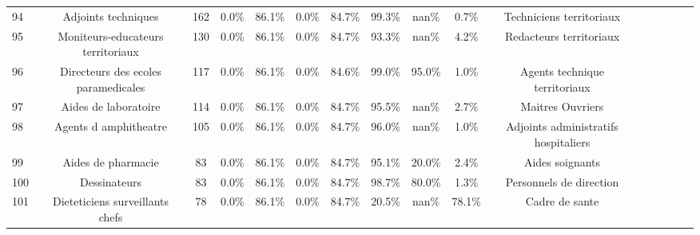\documentclass[10pt]{article}
\begin{document}
\begin{landscape}
\begin{longtable}{ | p{0.5cm} |*{15}{c|} }
94  &                                Adjoints techniques &            162 &           0.0\% &                  86.1\% &                 0.0\% &                    84.7\% &              99.3\% &                              nan\% &                                     0.7\% &                           Techniciens territoriaux \\
95  &                  Moniteurs-educateurs territoriaux &            130 &           0.0\% &                  86.1\% &                 0.0\% &                    84.7\% &              93.3\% &                              nan\% &                                     4.2\% &                            Redacteurs territoriaux \\
96  &                Directeurs des ecoles paramedicales &            117 &           0.0\% &                  86.1\% &                 0.0\% &                    84.6\% &              99.0\% &                             95.0\% &                                     1.0\% &                      Agents technique territoriaux \\
97  &                               Aides de laboratoire &            114 &           0.0\% &                  86.1\% &                 0.0\% &                    84.7\% &              95.5\% &                              nan\% &                                     2.7\% &                                   Maitres Ouvriers \\
98  &                              Agents d amphitheatre &            105 &           0.0\% &                  86.1\% &                 0.0\% &                    84.7\% &              96.0\% &                              nan\% &                                     1.0\% &               Adjoints administratifs hospitaliers \\
99  &                                 Aides de pharmacie &             83 &           0.0\% &                  86.1\% &                 0.0\% &                    84.7\% &              95.1\% &                             20.0\% &                                     2.4\% &                                    Aides soignants \\
100 &                                       Dessinateurs &             83 &           0.0\% &                  86.1\% &                 0.0\% &                    84.7\% &              98.7\% &                             80.0\% &                                     1.3\% &                            Personnels de direction \\
101 &                    Dieteticiens surveillants chefs &             78 &           0.0\% &                  86.1\% &                 0.0\% &                    84.7\% &              20.5\% &                              nan\% &                                    78.1\% &                                     Cadre de sante \\

\end{longtable}
\end{landscape}
\end{document}
